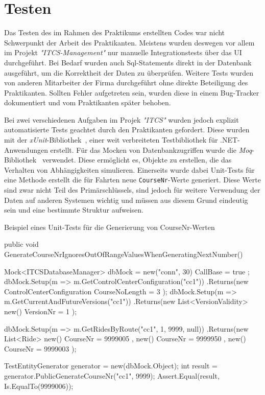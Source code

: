 \chapter{Testen}\label{chap:testen}
    Das Testen des im Rahmen des Praktikums erstellten Codes war nicht Schwerpunkt der Arbeit des Praktikanten. Meistens wurden deswegen vor allem im Projekt \emph{"ITCS-Management"} nur 
    manuelle Integrationstests über das UI durchgeführt. Bei Bedarf wurden auch Sql-Statements direkt in der Datenbank ausgeführt, um die Korrektheit der Daten zu überprüfen. 
    Weitere Tests wurden von anderen  Mitarbeiter der Firma durchgeführt ohne direkte Beteiligung des Praktikanten. Sollten 
    Fehler aufgetreten sein, wurden diese in einem Bug-Tracker dokumentiert und vom Praktikanten später behoben.

    Bei zwei verschiedenen Aufgaben im Projek \emph{"ITCS"} wurden jedoch explizit automatisierte Tests geachtet durch den Praktikanten gefordert.
    Diese wurden mit der \emph{xUnit}-Bibliothek~\cite{xunit}, einer weit verbreiteten Testbibliothek für .NET-Anwendungen erstellt.
    Für das Mocken von Datenbankzugriffen wurde die \emph{Moq}-Bibliothek~\cite{moq} verwendet. Diese ermöglicht es, Objekte zu erstellen, die das Verhalten von Abhängigkeiten simulieren.
    Einerseits wurde dabei Unit-Tests für eine Methode erstellt die für Fahrten neue \texttt{CourseNr}-Werte generiert. Diese Werte sind zwar nicht Teil des Primärschlüssels, sind jedoch 
    für weitere Verwendung der Daten auf anderen Systemen wichtig und müssen aus diesem Grund eindeutig sein und eine bestimmte Struktur aufweisen. 

    \begin{program} [H]
        \caption{Beispiel eines Unit-Tests für die Generierung von CourseNr-Werten}
        \label{prog:UnitTest}
    \begin{CsCode}[numbers=left]
[Fact]
public void GenerateCourseNrIgnoresOutOfRangeValuesWhenGeneratingNextNumber()
{
    Mock<ITCSDatabaseManager> dbMock = new("conn", 30) { CallBase = true };
    dbMock.Setup(m => m.GetControlCenterConfiguration("cc1"))
        .Returns(new ControlCenterConfiguration { CourseNoLength = 3 });
    dbMock.Setup(m => m.GetCurrentAndFutureVersions("cc1"))
        .Returns(new List<VersionValidity> { new() { VersionNr = 1 } });

    dbMock.Setup(m => m.GetRidesByRoute("cc1", 1, 9999, null))
        .Returns(new List<Ride> {
            new() { CourseNr = 9999005 },
            new() { CourseNr = 9999950 },
            new() { CourseNr = 9999003 }
        });

    TestEntityGenerator generator = new(dbMock.Object);
    int result = generator.PublicGenerateCourseNr("cc1", 9999);
    Assert.Equal(result, Is.EqualTo(9999006));
}\end{CsCode}
    \end{program}

